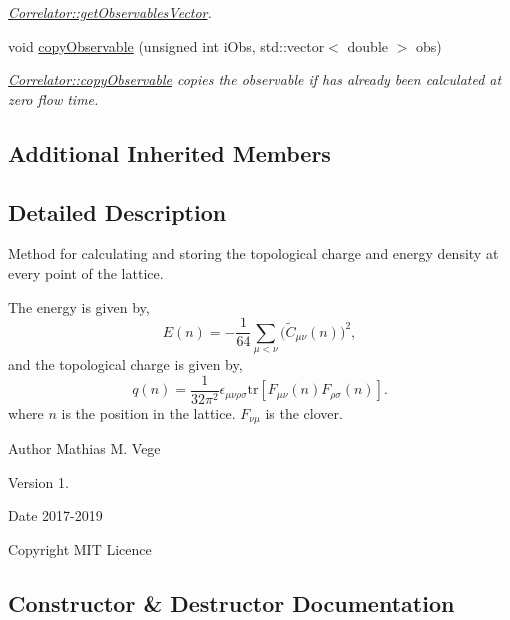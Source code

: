 \begin{DoxyCompactItemize}
\begin{DoxyCompactList}\small\item\em \mbox{\hyperlink{class_correlator_a7fb062b098beb078f3e546f4717b4941}{Correlator\+::get\+Observables\+Vector}}. \end{DoxyCompactList}\item 
void \mbox{\hyperlink{class_lattice_action_charge_density_aef63c9fba819e838a87b509d53be248b}{copy\+Observable}} (unsigned int i\+Obs, std\+::vector$<$ double $>$ obs)
\begin{DoxyCompactList}\small\item\em \mbox{\hyperlink{class_correlator_ac780d8b180294ee4801ede6e6a13f7f4}{Correlator\+::copy\+Observable}} copies the observable if has already been calculated at zero flow time. \end{DoxyCompactList}\end{DoxyCompactItemize}
\subsection*{Additional Inherited Members}


\subsection{Detailed Description}
Method for calculating and storing the topological charge and energy density at every point of the lattice. 

The energy is given by, \[ E(n) = -\frac{1}{64} \sum_{\mu<\nu} \big(\tilde{C}_{\mu\nu}(n)\big)^2, \] and the topological charge is given by, \[ q(n) = \frac{1}{32\pi^2} \epsilon_{\mu\nu\rho\sigma} \mathrm{tr}\left[F_{\mu\nu}(n)F_{\rho\sigma}(n)\right]. \] where $n$ is the position in the lattice. $F_{\nu\mu}$ is the clover.

\begin{DoxyAuthor}{Author}
Mathias M. Vege 
\end{DoxyAuthor}
\begin{DoxyVersion}{Version}
1. 
\end{DoxyVersion}
\begin{DoxyDate}{Date}
2017-\/2019 
\end{DoxyDate}
\begin{DoxyCopyright}{Copyright}
M\+IT Licence 
\end{DoxyCopyright}


\subsection{Constructor \& Destructor Documentation}
\mbox{\label{class_lattice_action_charge_density_acda2a43db75cca34586441d4ac7ec39e}} 
